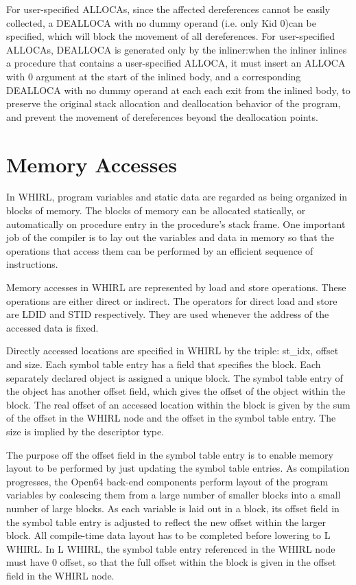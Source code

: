 \begin{itemize}
For user-specified
%
ALLOCAs, since the affected dereferences cannot
be easily collected, a
%
DEALLOCA with no dummy operand (i.e. only Kid 0)can be specified,
which will block the movement of all dereferences. For
user-specified
%
ALLOCAs,
%
DEALLOCA is generated only by the inliner:when
the inliner inlines a procedure that contains a user-specified
%
ALLOCA, it must insert an
%
ALLOCA with 0 argument at the start of
the inlined body, and a corresponding
%
DEALLOCA with no dummy operand at each
each exit from the inlined body, to preserve the original stack
allocation and deallocation behavior of the program, and prevent
the movement of dereferences beyond the deallocation points.

\end{itemize}
\section{Memory Accesses}

In WHIRL, program variables and static data are regarded as being
organized in blocks of memory. The blocks of memory can be allocated
statically, or automatically on procedure entry in the procedure's
stack frame. One important job of the compiler is to lay out the
variables and data in memory so that the operations that access
them can be performed by an efficient sequence of instructions.

Memory accesses in WHIRL are represented by load and store operations.
These operations are either direct or indirect. The operators for
direct load and store are
%
LDID and
%
STID respectively. They are
used whenever the address of the accessed data is fixed.

Directly accessed locations are specified in WHIRL by the 
triple: st\_idx, offset and size. Each symbol table entry has a field that
specifies the block. Each separately declared object is assigned
a unique block. The symbol table entry of the object has another
offset field, which gives the offset of the object within the block.
The real offset of an accessed location within the block is given
by the sum of the offset in the WHIRL node and the offset in the
symbol table entry. The size is implied by the descriptor type.

The purpose off the offset field in the symbol table entry is to
enable memory layout to be performed by just updating the symbol
table entries. As compilation progresses, the Open64 back-end
components perform layout of the program variables by coalescing
them from a large number of smaller blocks into a small number of
large blocks. As each variable is laid out in a block, its offset
field in the symbol table entry is adjusted to reflect the new
offset within the larger block. All compile-time data layout has
to be completed before lowering to L WHIRL. In L WHIRL, the symbol
table entry referenced in the WHIRL node must have 0 offset, so that
the full offset within the block is given in the offset field in
the WHIRL node. 

